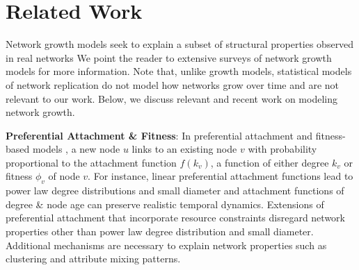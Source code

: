 \section{Related Work}
\label{sec:Related Work}
Network growth models seek to explain a subset of structural properties observed in real
networks
We point the reader to
extensive surveys \cite{newman2003structure,albert2002statistical} of network growth models
for more information.
Note that, unlike growth models, statistical models of network replication \cite{leskovec2010kronecker,pfeiffer2014attributed}
do not model how networks grow over time and are not relevant to our work.
Below, we discuss relevant and recent work on modeling network growth.

\textbf{Preferential Attachment \& Fitness}:
In preferential attachment and fitness-based models \cite{bell2017network,medo2011temporal,bianconi2001bose,caldarelli2002scale}, a new node $u$ links to an existing node $v$
with probability proportional to the attachment function $f(k_v)$, a function of
either degree $k_v$ or fitness $\phi_v$ of node $v$.
For instance, linear preferential attachment functions
\cite{barabasi1999emergence,kumar2000stochastic,dorogovtsev2000structure} lead to
power law degree distributions and small diameter \cite{bollobas2004diameter}
and attachment functions of degree \& node age \cite{wang2013quantifying}
can preserve realistic temporal dynamics.
Extensions of preferential
attachment \cite{mossa2002truncation,zeng2005construction,wang2009local} that
incorporate resource constraints
disregard network properties other than power law degree distribution and small diameter.
Additional mechanisms are necessary to explain network properties
such as clustering and attribute mixing patterns.


